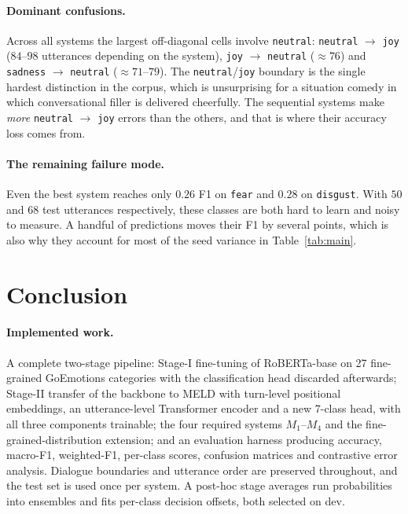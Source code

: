 \documentclass[sigconf,nonacm]{acmart}
\begin{document}
\paragraph{Dominant confusions.}
Across all systems the largest off-diagonal cells involve \texttt{neutral}:
\texttt{neutral} $\rightarrow$ \texttt{joy} ($84$--$98$ utterances depending on the system),
\texttt{joy} $\rightarrow$ \texttt{neutral} ($\approx 76$) and
\texttt{sadness} $\rightarrow$ \texttt{neutral} ($\approx 71$--$79$). The
\texttt{neutral}/\texttt{joy} boundary is the single hardest distinction in the corpus,
which is unsurprising for a situation comedy in which conversational filler is delivered
cheerfully. The sequential systems make \emph{more} \texttt{neutral} $\rightarrow$
\texttt{joy} errors than the others, and that is where their accuracy loss comes from.

\paragraph{The remaining failure mode.}
Even the best system reaches only $0.26$ F1 on \texttt{fear} and $0.28$ on
\texttt{disgust}. With $50$ and $68$ test utterances respectively, these classes are both
hard to learn and noisy to measure. A handful of predictions moves their F1 by several
points, which is also why they account for most of the seed variance in Table~\ref{tab:main}.

\section{Conclusion}

\paragraph{Implemented work.}
A complete two-stage pipeline: Stage-I fine-tuning of RoBERTa-base on 27 fine-grained
GoEmotions categories with the classification head discarded afterwards; Stage-II transfer
of the backbone to MELD with turn-level positional embeddings, an utterance-level
Transformer encoder and a new 7-class head, with all three components trainable; the four
required systems $M_1$--$M_4$ and the fine-grained-distribution extension; and an evaluation
harness producing accuracy, macro-F1, weighted-F1, per-class scores, confusion matrices and
contrastive error analysis. Dialogue boundaries and utterance order are preserved
throughout, and the test set is used once per system. A post-hoc stage averages run
probabilities into ensembles and fits per-class decision offsets, both selected on dev.
\end{document}
